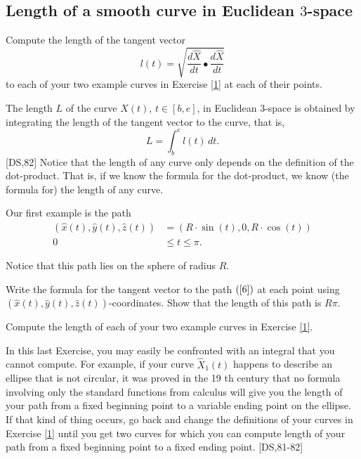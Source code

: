 \subsection*{Length of a smooth curve in Euclidean $3$-space}

\begin{exercise}
Compute the length of the tangent vector
\[
l(t)=\sqrt{\frac{d\hat{X}}{dt}\bullet\frac{d\hat{X}}{dt}}%
\]
to each of your two example curves in Exercise \ref{1} at each of their points.
\end{exercise}

\begin{definition}
The length $L$ of the curve $\hat{X}\left(  t\right)  $, $t\in\left[
b,e\right]  $, in Euclidean $3$-space is obtained by integrating the length of
the tangent vector to the curve, that is,%
\[
L=
{\displaystyle\int\nolimits_{b}^{e}}
l\left(  t\right)  \,dt.
\]
[DS,82] Notice that the length of any curve only depends on the definition of
the dot-product. That is, if we know the formula for the dot-product, we know
(the formula for) the length of any curve.
\end{definition}

Our first example is the path%
\begin{align}
\left(  \hat{x}\left(  t\right)  ,\hat{y}\left(  t\right)  ,\hat{z}\left(
t\right)  \right)   &  =\left(  R\cdot \sin\left(  t\right)  ,0,R\cdot
\cos\left(  t\right)  \right) \label{6}\\
0\,  &  \leq t\leq\pi.
\end{align}


Notice that this path lies on the sphere of radius $R$.

\begin{exercise}
Write the formula for the tangent vector to the path $\left(  \ref{6}\right)
$ at each point using $\left(  \hat{x}\left(  t\right)  ,\hat{y}\left(
t\right)  ,\hat{z}\left(  t\right)  \right)  $-coordinates. Show that the
length of this path is $R\pi$.
\end{exercise}

\begin{exercise}
Compute the length of each of your two example curves in Exercise \ref{1}.
\end{exercise}

\begin{remark}
In this last Exercise, you may easily be confronted with an integral that you
cannot compute. For example, if your curve $\hat{X}_{1}\left(  t\right)  $
happens to describe an ellipse that is not circular, it was proved in the 19
th century that no formula involving only the standard functions from calculus
will give you the length of your path from a fixed beginning point to a
variable ending point on the ellipse. If that kind of thing occurs, go back
and change the definitions of your curves in Exercise \ref{1} until you get
two curves for which you can compute length of your path from a fixed
beginning point to a fixed ending point. [DS,81-82]
\end{remark}

